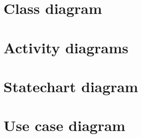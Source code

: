 \section{Class diagram}
\begin{landscape}
%

\end{landscape}


\section{Activity diagrams}
\subsection{}

\section{Statechart diagram}
\begin{landscape}

\end{landscape}

\section{Use case diagram}
\begin{landscape}

\end{landscape}
